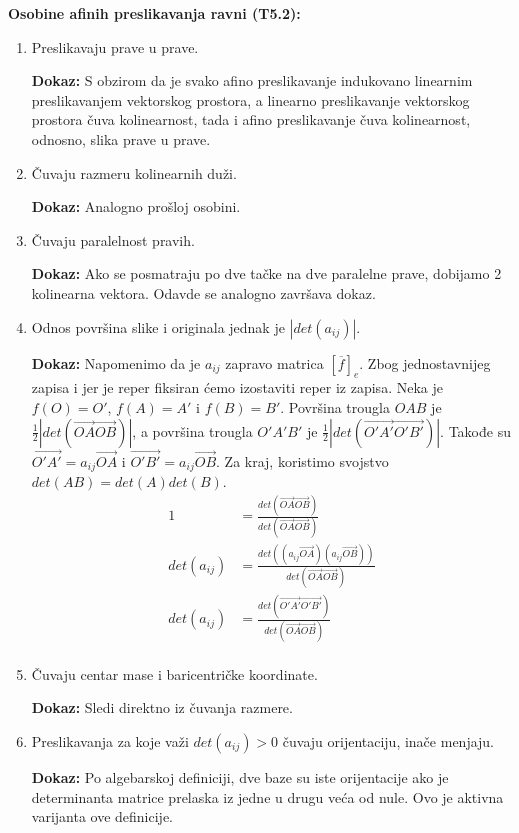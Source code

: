 \documentclass[12pt]{article}
\newcommand{\vek}[1]{\overrightarrow{#1}}
\begin{document}
\textbf{Osobine afinih preslikavanja ravni (T5.2):}
\begin{enumerate}[label=\textbf{(\arabic*)}]
    \item Preslikavaju prave u prave.
          \par
          \textbf{Dokaz:} S obzirom da je svako afino preslikavanje indukovano
          linearnim preslikavanjem vektorskog prostora, a linearno
          preslikavanje vektorskog prostora čuva kolinearnost, tada i afino
          preslikavanje čuva kolinearnost, odnosno, slika prave u prave.

    \item Čuvaju razmeru kolinearnih duži.
          \par
          \textbf{Dokaz:} Analogno prošloj osobini.

    \item Čuvaju paralelnost pravih.
          \par
          \textbf{Dokaz:} Ako se posmatraju po dve tačke na dve paralelne
          prave, dobijamo 2 kolinearna vektora. Odavde se analogno završava
          dokaz.

    \item Odnos površina slike i originala jednak je $|det(a_{ij})|$.
          \par
          \textbf{Dokaz:} Napomenimo da je $a_{ij}$ zapravo matrica
          $[\overline{f}]_e$. Zbog jednostavnijeg zapisa i jer je reper
          fiksiran ćemo izostaviti reper iz zapisa. Neka je $f(O)=O'$,
          $f(A)=A'$ i $f(B)=B'$. Površina trougla $OAB$ je
          $\frac{1}{2}|det(\vek{OA}\vek{OB})|$, a površina trougla $O'A'B'$ je
          $\frac{1}{2}|det(\vek{O'A'}\vek{O'B'})|$. Takođe su
          $\vek{O'A'}=a_{ij}\vek{OA}$ i $\vek{O'B'}=a_{ij}\vek{OB}$. Za kraj,
          koristimo svojstvo $det(AB)=det(A)det(B)$.
          \begin{align*}
              1           & =\frac{det(\vek{OA}\vek{OB})}{det(\vek{OA}\vek{OB})}                 \\
              det(a_{ij}) & =\frac{det((a_{ij}\vek{OA})(a_{ij}\vek{OB}))}{det(\vek{OA}\vek{OB})} \\
              det(a_{ij}) & =\frac{det(\vek{O'A'}\vek{O'B'})}{det(\vek{OA}\vek{OB})}             \\
          \end{align*}

    \item Čuvaju centar mase i baricentričke koordinate.
          \par
          \textbf{Dokaz:} Sledi direktno iz čuvanja razmere.

    \item Preslikavanja za koje važi $det(a_{ij})>0$ čuvaju orijentaciju,
          inače menjaju.
          \par
          \textbf{Dokaz:} Po algebarskoj definiciji, dve baze su iste
          orijentacije ako je determinanta matrice prelaska iz jedne u drugu
          veća od nule. Ovo je aktivna varijanta ove definicije.
\end{enumerate}
\par
\end{document}
